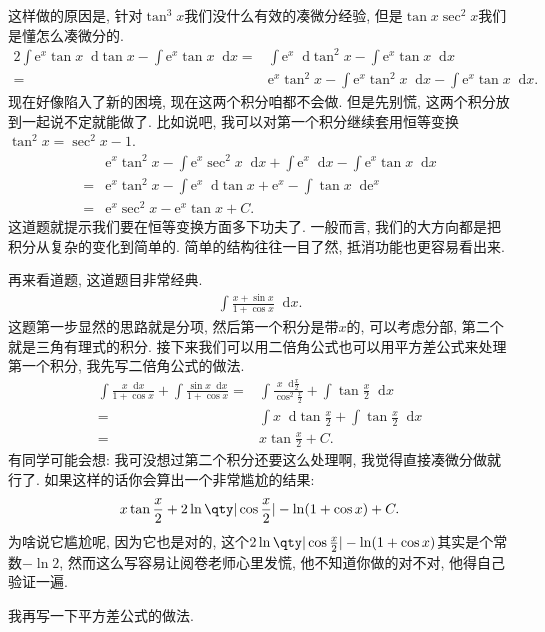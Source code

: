 \documentclass{ctexbook}
\newcommand{\e}{\mathrm{e}}
\newcommand*{\dif}{\mathop{}\!\mathrm{d}}
\begin{document}
{这样做的原因是, 针对$\tan^{3}{x}$我们没什么有效的凑微分经验, 但是$\tan{x}\sec^{2}{x}$我们是懂怎么凑微分的. 
\begin{align*}
2\int\e^{x}\tan{x}\dif{\tan{x}}-\int\e^{x}\tan{x}\dif{x}={}&\int\e^{x}\dif{\tan^{2}{x}}-\int\e^{x}\tan{x}\dif{x}\\
={}&\e^{x}\tan^{2}{x}-\int\e^{x}\tan^{2}{x}\dif{x}-\int\e^{x}\tan{x}\dif{x}
.\end{align*}
现在好像陷入了新的困境, 现在这两个积分咱都不会做. 但是先别慌, 这两个积分放到一起说不定就能做了. 比如说吧, 我可以对第一个积分继续套用恒等变换$\tan^{2}{x}=\sec^{2}{x}-1$. 
\begin{align*}
{}&\e^{x}\tan^{2}{x}-\int\e^{x}\sec^{2}{x}\dif{x}+\int\e^{x}\dif{x}-\int\e^{x}\tan{x}\dif{x}\\
={}&\e^{x}\tan^{2}{x}-\int\e^{x}\dif{\tan{x}}+\e^{x}-\int\tan{x}\dif{\e^{x}}\\
={}&\e^{x}\sec^{2}{x}-\e^{x}\tan{x}+C
.\end{align*}
这道题就提示我们要在恒等变换方面多下功夫了. 一般而言, 我们的大方向都是把积分从复杂的变化到简单的. 简单的结构往往一目了然, 抵消功能也更容易看出来. \par
再来看道题, 这道题目非常经典. 
\begin{align*}
\int\frac{x+\sin{x}}{1+\cos{x}}\dif{x}
.\end{align*}
这题第一步显然的思路就是分项, 然后第一个积分是带$x$的, 可以考虑分部, 第二个就是三角有理式的积分. 接下来我们可以用二倍角公式也可以用平方差公式来处理第一个积分, 我先写二倍角公式的做法. 
\begin{align*}
\int\frac{x\dif{x}}{1+\cos{x}}+\int\frac{\sin{x}\dif{x}}{1+\cos{x}}={}&\int\frac{x\dif{\frac{x}{2}}}{\cos^{2}{\frac{x}{2}}}+\int\tan{\frac{x}{2}}\dif{x}\\
={}&\int x\dif{\tan{\frac{x}{2}}}+\int\tan{\frac{x}{2}}\dif{x}\\
={}&x\tan{\frac{x}{2}}+C
.\end{align*}
有同学可能会想: 我可没想过第二个积分还要这么处理啊, 我觉得直接凑微分做就行了. 如果这样的话你会算出一个非常尴尬的结果: 
\begin{align*}
x\tan{\frac{x}{2}}+2\ln\qty|\cos{\frac{x}{2}}|-\ln(1+\cos{x})+C
.\end{align*}
为啥说它尴尬呢, 因为它也是对的, 这个$2\ln\qty|\cos{\frac{x}{2}}|-\ln(1+\cos{x})$其实是个常数$-\ln{2}$, 然而这么写容易让阅卷老师心里发慌, 他不知道你做的对不对, 他得自己验证一遍. \par
我再写一下平方差公式的做法. 
\begin{align*}

\end{align*}}
\end{document}
